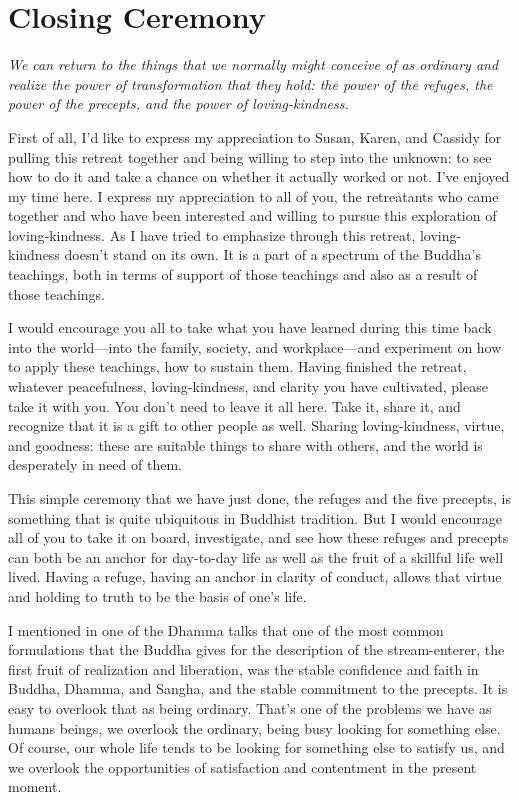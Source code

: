 \chapter{Closing Ceremony}

\epigraph{\emph{We can return to the things that we normally might
conceive of as ordinary and realize the power of transformation that
they hold: the power of the refuges, the power of the precepts, and the
power of loving-kindness.}}{}

First of all, I’d like to express my appreciation to Susan, Karen, and
Cassidy for pulling this retreat together and being willing to step into
the unknown: to see how to do it and take a chance on whether it
actually worked or not. I’ve enjoyed my time here. I express my
appreciation to all of you, the retreatants who came together and who
have been interested and willing to pursue this exploration of
loving-kindness. As I have tried to emphasize through this retreat,
loving-kindness doesn’t stand on its own. It is a part of a spectrum of
the Buddha’s teachings, both in terms of support of those teachings and
also as a result of those teachings.

I would encourage you all to take what you have learned during this time
back into the world—into the family, society, and workplace—and
experiment on how to apply these teachings, how to sustain them. Having
finished the retreat, whatever peacefulness, loving-kindness, and
clarity you have cultivated, please take it with you. You don’t need to
leave it all here. Take it, share it, and recognize that it is a gift to
other people as well. Sharing loving-kindness, virtue, and goodness:
these are suitable things to share with others, and the world is
desperately in need of them.

This simple ceremony that we have just done, the refuges and the five
precepts, is something that is quite ubiquitous in Buddhist tradition.
But I would encourage all of you to take it on board, investigate, and
see how these refuges and precepts can both be an anchor for day-to-day
life as well as the fruit of a skillful life well lived. Having a
refuge, having an anchor in clarity of conduct, allows that virtue and
holding to truth to be the basis of one’s life.

I mentioned in one of the Dhamma talks that one of the most common
formulations that the Buddha gives for the description of the
stream-enterer, the first fruit of realization and liberation, was the
stable confidence and faith in Buddha, Dhamma, and Sangha, and the
stable commitment to the precepts. It is easy to overlook that as being
ordinary. That’s one of the problems we have as humans beings, we
overlook the ordinary, being busy looking for something else. Of course,
our whole life tends to be looking for something else to satisfy us, and
we overlook the opportunities of satisfaction and contentment in the
present moment.


